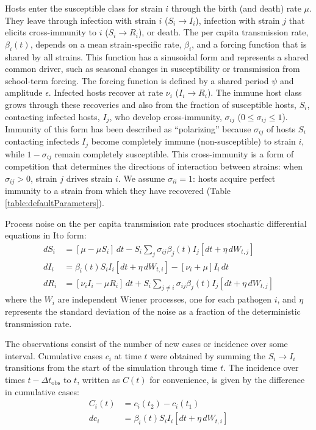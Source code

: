 \documentclass[10pt,letterpaper]{article}
\begin{document}
Hosts enter the susceptible class for strain $i$ through the birth (and death) rate $\mu$. 
They leave through infection with strain $i$ ($S_i \to I_i$), infection with strain $j$ that elicits cross-immunity to $i$ ($S_i \to R_i$), or death.
The per capita transmission rate, $\beta_i(t)$, depends on a mean strain-specific rate, $\beta_i$, and a forcing function that is shared by all strains.
This function has a sinusoidal form and represents a shared common driver, such as seasonal changes in susceptibility or transmission from school-term forcing.
The forcing function is defined by a shared period $\psi$ and amplitude $\epsilon$.
Infected hosts recover at rate $\nu_i$ ($I_i \to R_i$).
The immune host class grows through these recoveries and also from the fraction of susceptible hosts, $S_i$, contacting infected hosts, $I_j$, who develop cross-immunity, $\sigma_{ij}$ ($0 \leq \sigma_{ij} \leq 1$).
Immunity of this form has been described as ``polarizing'' because $\sigma_{ij}$ of hosts $S_i$ contacting infecteds $I_j$ become completely immune (non-susceptible) to strain $i$, while $1-\sigma_{ij}$ remain completely susceptible.
This cross-immunity is a form of competition that determines the directions of interaction between strains: when $\sigma_{ij}>0$, strain $j$ drives strain $i$.
We assume $\sigma_{ii}=1$: hosts acquire perfect immunity to a strain from which they have recovered (Table \ref{table:defaultParameters}).

Process noise on the per capita transmission rate produces stochastic differential equations in Ito form:
\begin{align}
dS_i &=
	[\mu - \mu S_i] \, dt
	- S_i\sum\limits_{j} \sigma_{ij} \beta_j(t) I_j [dt +\eta \, dW_{t,j}] 
	\\
dI_i &= 
	\beta_i(t) S_i I_i [dt +  \eta \, dW_{t,i}]
	- [\nu_i + \mu] I_i \,  dt \\
dR_i &=
	[\nu_i I_i - \mu R_i] \, dt
	+ S_i\sum\limits_{j \neq i} \sigma_{ij} \beta_j(t) I_j [dt +  \eta \, dW_{t,j}]
\end{align}
where the $W_i$ are independent Wiener processes, one for each pathogen $i$, and $\eta$ represents the standard deviation of the noise as a fraction of the deterministic transmission rate.

The observations consist of the number of new cases or incidence over some interval. 
Cumulative cases $c_i$ at time $t$ were obtained by summing the $S_i \to I_i$ transitions from the start of the simulation through time $t$.
The incidence over times $t-\Delta t_\text{obs}$ to $t$, written as $C(t)$ for convenience, is given by the difference in cumulative cases:
\begin{align}
C_i(t) &= c_i(t_2) - c_i(t_1) \\
dc_i &= \beta_i(t) S_i I_i [dt + \eta \, dW_{t,i}]
\end{align}
\end{document}

